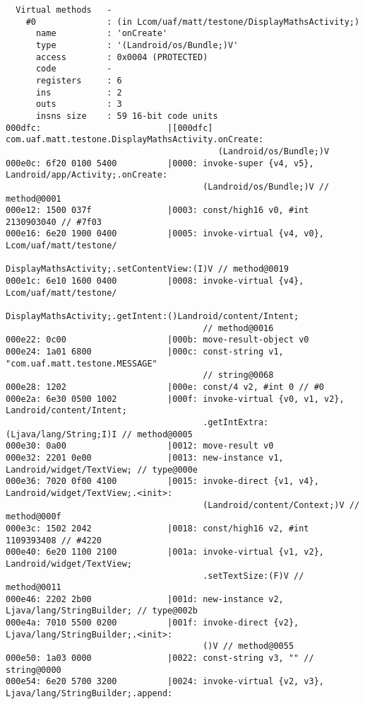 \begin{lstlisting}
  Virtual methods   -
    #0              : (in Lcom/uaf/matt/testone/DisplayMathsActivity;)
      name          : 'onCreate'
      type          : '(Landroid/os/Bundle;)V'
      access        : 0x0004 (PROTECTED)
      code          -
      registers     : 6
      ins           : 2
      outs          : 3
      insns size    : 59 16-bit code units
000dfc:                         |[000dfc] com.uaf.matt.testone.DisplayMathsActivity.onCreate:
                                          (Landroid/os/Bundle;)V
000e0c: 6f20 0100 5400          |0000: invoke-super {v4, v5}, Landroid/app/Activity;.onCreate:
                                       (Landroid/os/Bundle;)V // method@0001
000e12: 1500 037f               |0003: const/high16 v0, #int 2130903040 // #7f03
000e16: 6e20 1900 0400          |0005: invoke-virtual {v4, v0}, Lcom/uaf/matt/testone/
                                       DisplayMathsActivity;.setContentView:(I)V // method@0019
000e1c: 6e10 1600 0400          |0008: invoke-virtual {v4}, Lcom/uaf/matt/testone/
                                       DisplayMathsActivity;.getIntent:()Landroid/content/Intent;
                                       // method@0016
000e22: 0c00                    |000b: move-result-object v0
000e24: 1a01 6800               |000c: const-string v1, "com.uaf.matt.testone.MESSAGE"
                                       // string@0068
000e28: 1202                    |000e: const/4 v2, #int 0 // #0
000e2a: 6e30 0500 1002          |000f: invoke-virtual {v0, v1, v2}, Landroid/content/Intent;
                                       .getIntExtra:(Ljava/lang/String;I)I // method@0005
000e30: 0a00                    |0012: move-result v0
000e32: 2201 0e00               |0013: new-instance v1, Landroid/widget/TextView; // type@000e
000e36: 7020 0f00 4100          |0015: invoke-direct {v1, v4}, Landroid/widget/TextView;.<init>:
                                       (Landroid/content/Context;)V // method@000f
000e3c: 1502 2042               |0018: const/high16 v2, #int 1109393408 // #4220
000e40: 6e20 1100 2100          |001a: invoke-virtual {v1, v2}, Landroid/widget/TextView;
                                       .setTextSize:(F)V // method@0011
000e46: 2202 2b00               |001d: new-instance v2, Ljava/lang/StringBuilder; // type@002b
000e4a: 7010 5500 0200          |001f: invoke-direct {v2}, Ljava/lang/StringBuilder;.<init>:
                                       ()V // method@0055
000e50: 1a03 0000               |0022: const-string v3, "" // string@0000
000e54: 6e20 5700 3200          |0024: invoke-virtual {v2, v3}, Ljava/lang/StringBuilder;.append:

\end{lstlisting}
